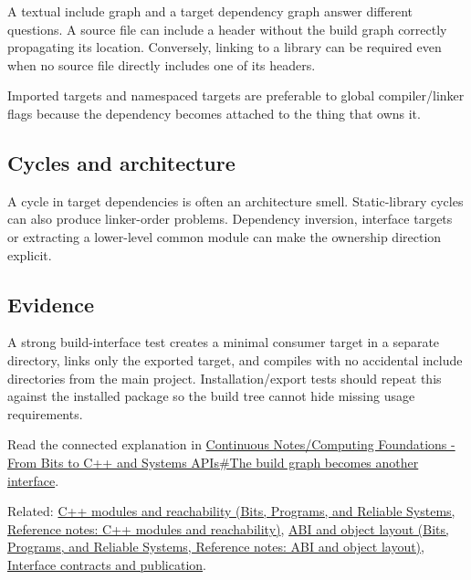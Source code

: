 \hypertarget{appendix-3327b8977adf-build-graph-versus-include-graph}{}

A textual include graph and a target dependency graph answer different questions. A source file can include a header without the build graph correctly propagating its location. Conversely, linking to a library can be required even when no source file directly includes one of its headers.

Imported targets and namespaced targets are preferable to global compiler/linker flags because the dependency becomes attached to the thing that owns it.

\subsection{Cycles and architecture}\label{appendix-3327b8977adf-cycles-and-architecture}

\hypertarget{appendix-3327b8977adf-cycles-and-architecture}{}

A cycle in target dependencies is often an architecture smell. Static-library cycles can also produce linker-order problems. Dependency inversion, interface targets or extracting a lower-level common module can make the ownership direction explicit.

\subsection{Evidence}\label{appendix-3327b8977adf-evidence}

\hypertarget{appendix-3327b8977adf-evidence}{}

A strong build-interface test creates a minimal consumer target in a separate directory, links only the exported target, and compiles with no accidental include directories from the main project. Installation/export tests should repeat this against the installed package so the build tree cannot hide missing usage requirements.

Read the connected explanation in \hyperref[01-foundations-i-ch008-the-build-graph-becomes-another-interface]{Continuous Notes/Computing Foundations - From Bits to C++ and Systems APIs\#The build graph becomes another interface}.

Related: \href{../01-Bits-Programs-and-Reliable-Systems/main.pdf\#nameddest=appendix-410a611a5b8d}{C++ modules and reachability (Bits, Programs, and Reliable Systems, Reference notes: C++ modules and reachability)}, \href{../01-Bits-Programs-and-Reliable-Systems/main.pdf\#nameddest=appendix-c4ac6bb0fff8}{ABI and object layout (Bits, Programs, and Reliable Systems, Reference notes: ABI and object layout)}, \hyperref[appendix-fdae7ff0a23f]{Interface contracts and publication}.
